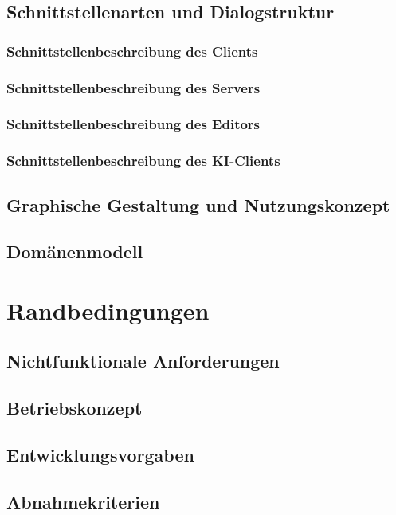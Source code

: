 \documentclass{uulm-assignment}
\begin{document}
\subsection{Schnittstellenarten und Dialogstruktur}
\subsubsection{Schnittstellenbeschreibung des Clients}

\clearpage
\subsubsection{Schnittstellenbeschreibung des Servers}

\subsubsection{Schnittstellenbeschreibung des Editors}

\clearpage
\subsubsection{Schnittstellenbeschreibung des KI-Clients}

\clearpage
\subsection{Graphische Gestaltung und Nutzungskonzept}


\clearpage
\subsection{Domänenmodell}


\clearpage
\section{Randbedingungen}
\subsection{Nichtfunktionale Anforderungen}

\subsection{Betriebskonzept}

\subsection{Entwicklungsvorgaben}

\subsection{Abnahmekriterien}

\end{document}
